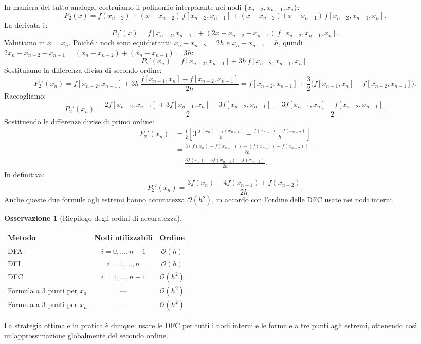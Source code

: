 \documentclass[a4paper,12pt]{article}
\theoremstyle{definition}
\newtheorem{osservazione}{Osservazione}[section]
\theoremstyle{remark}
\begin{document}
In maniera del tutto analoga, costruiamo il polinomio interpolante
nei nodi $\{x_{n-2}, x_{n-1}, x_n\}$:
\[
  P_2(x)
  = f(x_{n-2})
  + (x - x_{n-2})\,f[x_{n-2}, x_{n-1}]
  + (x - x_{n-2})(x - x_{n-1})\,f[x_{n-2}, x_{n-1}, x_n].
\]
La derivata è:
\[
  P_2'(x) = f[x_{n-2}, x_{n-1}] + (2x - x_{n-2} - x_{n-1})\,f[x_{n-2}, x_{n-1}, x_n].
\]
Valutiamo in $x = x_n$.
Poiché i nodi sono equidistanti:
$x_n - x_{n-2} = 2h$ e $x_n - x_{n-1} = h$, quindi
$2x_n - x_{n-2} - x_{n-1} = (x_n - x_{n-2}) + (x_n - x_{n-1}) = 3h$:
\[
  P_2'(x_n)
  = f[x_{n-2}, x_{n-1}] + 3h\,f[x_{n-2}, x_{n-1}, x_n].
\]
Sostituiamo la differenza divisa di secondo ordine:
\[
  P_2'(x_n)
  = f[x_{n-2}, x_{n-1}]
  + 3h\,\frac{f[x_{n-1}, x_n] - f[x_{n-2}, x_{n-1}]}{2h}
  = f[x_{n-2}, x_{n-1}]
  + \frac{3}{2}\bigl(f[x_{n-1}, x_n] - f[x_{n-2}, x_{n-1}]\bigr).
\]
Raccogliamo:
\[
  P_2'(x_n)
  = \frac{2 f[x_{n-2}, x_{n-1}] + 3 f[x_{n-1}, x_n] - 3 f[x_{n-2}, x_{n-1}]}{2}
  = \frac{3 f[x_{n-1}, x_n] - f[x_{n-2}, x_{n-1}]}{2}.
\]
Sostituendo le differenze divise di primo ordine:
\begin{align*}
  P_2'(x_n)
  &= \frac{1}{2}\left[3\,\frac{f(x_n)-f(x_{n-1})}{h}
     - \frac{f(x_{n-1})-f(x_{n-2})}{h}\right]\\
  &= \frac{3(f(x_n)-f(x_{n-1})) - (f(x_{n-1})-f(x_{n-2}))}{2h}\\
  &= \frac{3f(x_n) - 4f(x_{n-1}) + f(x_{n-2})}{2h}.
\end{align*}
In definitiva:
\[
  \boxed{P_2'(x_n) = \frac{3f(x_n) - 4f(x_{n-1}) + f(x_{n-2})}{2h}}.
\]
Anche queste due formule agli estremi hanno accuratezza $\mathcal{O}(h^2)$,
in accordo con l'ordine delle DFC usate nei nodi interni.

\begin{osservazione}[Riepilogo degli ordini di accuratezza]
\begin{center}
\begin{tabular}{lcc}
  \hline
  \textbf{Metodo} & \textbf{Nodi utilizzabili} & \textbf{Ordine} \\
  \hline
  DFA & $i = 0, \ldots, n-1$ & $\mathcal{O}(h)$ \\
  DFI & $i = 1, \ldots, n$   & $\mathcal{O}(h)$ \\
  DFC & $i = 1, \ldots, n-1$ & $\mathcal{O}(h^2)$ \\
  Formula a 3 punti per $x_0$    & — & $\mathcal{O}(h^2)$ \\
  Formula a 3 punti per $x_n$    & — & $\mathcal{O}(h^2)$ \\
  \hline
\end{tabular}
\end{center}
La strategia ottimale in pratica è dunque: usare le DFC per tutti i nodi
interni e le formule a tre punti agli estremi, ottenendo così un'approssimazione
globalmente del secondo ordine.
\end{osservazione}
\end{document}
